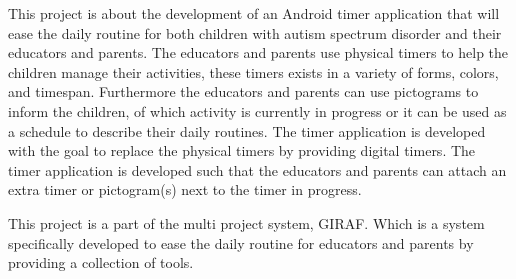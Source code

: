 \vspace{0.3cm}
This project is about the development of an Android\texttrademark \hspace{0.1cm} timer application that will ease the daily routine for both children with autism spectrum disorder and their educators and parents. The educators and parents use physical timers to help the children manage their activities, these timers exists in a variety of forms, colors, and timespan. Furthermore the educators and parents can use pictograms to inform the children, of which activity is currently in progress or it can be used as a schedule to describe their daily routines. The timer application is developed with the goal to replace the physical timers by providing digital timers. The timer application is developed such that the educators and parents can attach an extra timer or pictogram(s) next to the timer in progress.

This project is a part of the multi project system, GIRAF. Which is a system specifically developed to ease the daily routine for educators and parents by providing a collection of tools.